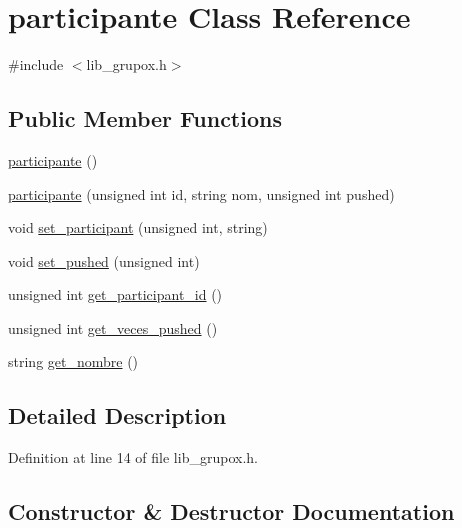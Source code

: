 \hypertarget{classparticipante}{}\section{participante Class Reference}
\label{classparticipante}


{\ttfamily \#include $<$lib\+\_\+grupox.\+h$>$}

\subsection*{Public Member Functions}
\begin{DoxyCompactItemize}
\item 
\hyperlink{classparticipante_a23dad13159ab3128aaa5ff566d17651c}{participante} ()
\item 
\hyperlink{classparticipante_a585a21b68cdaf42e2c4e14db840eacef}{participante} (unsigned int id, string nom, unsigned int pushed)
\item 
void \hyperlink{classparticipante_ab315d25505963e66486cc24b1eafef32}{set\+\_\+participant} (unsigned int, string)
\item 
void \hyperlink{classparticipante_a993d194c0c2f2d2e2ce13a23f8ca2a35}{set\+\_\+pushed} (unsigned int)
\item 
unsigned int \hyperlink{classparticipante_a7bf312844c7814bcaaf6b20466a16283}{get\+\_\+participant\+\_\+id} ()
\item 
unsigned int \hyperlink{classparticipante_a7141f603db73fc7efa9788e41aa8dd66}{get\+\_\+veces\+\_\+pushed} ()
\item 
string \hyperlink{classparticipante_a00d27dd27a5bf61677c8dfc8937e1b43}{get\+\_\+nombre} ()
\end{DoxyCompactItemize}


\subsection{Detailed Description}


Definition at line 14 of file lib\+\_\+grupox.\+h.



\subsection{Constructor \& Destructor Documentation}
\mbox{\label{classparticipante_a23dad13159ab3128aaa5ff566d17651c}} 
